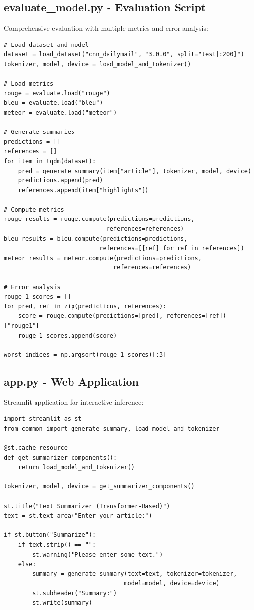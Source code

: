 \documentclass[12pt,a4paper,oneside]{report}
\begin{document}
\subsection{evaluate\_model.py - Evaluation Script}
Comprehensive evaluation with multiple metrics and error analysis:
\begin{lstlisting}
# Load dataset and model
dataset = load_dataset("cnn_dailymail", "3.0.0", split="test[:200]")
tokenizer, model, device = load_model_and_tokenizer()

# Load metrics
rouge = evaluate.load("rouge")
bleu = evaluate.load("bleu")
meteor = evaluate.load("meteor")

# Generate summaries
predictions = []
references = []
for item in tqdm(dataset):
    pred = generate_summary(item["article"], tokenizer, model, device)
    predictions.append(pred)
    references.append(item["highlights"])

# Compute metrics
rouge_results = rouge.compute(predictions=predictions,
                             references=references)
bleu_results = bleu.compute(predictions=predictions,
                           references=[[ref] for ref in references])
meteor_results = meteor.compute(predictions=predictions,
                               references=references)

# Error analysis
rouge_1_scores = []
for pred, ref in zip(predictions, references):
    score = rouge.compute(predictions=[pred], references=[ref])["rouge1"]
    rouge_1_scores.append(score)

worst_indices = np.argsort(rouge_1_scores)[:3]
\end{lstlisting}

\subsection{app.py - Web Application}
Streamlit application for interactive inference:
\begin{lstlisting}
import streamlit as st
from common import generate_summary, load_model_and_tokenizer

@st.cache_resource
def get_summarizer_components():
    return load_model_and_tokenizer()

tokenizer, model, device = get_summarizer_components()

st.title("Text Summarizer (Transformer-Based)")
text = st.text_area("Enter your article:")

if st.button("Summarize"):
    if text.strip() == "":
        st.warning("Please enter some text.")
    else:
        summary = generate_summary(text=text, tokenizer=tokenizer,
                                  model=model, device=device)
        st.subheader("Summary:")
        st.write(summary)
\end{lstlisting}
\end{document}
